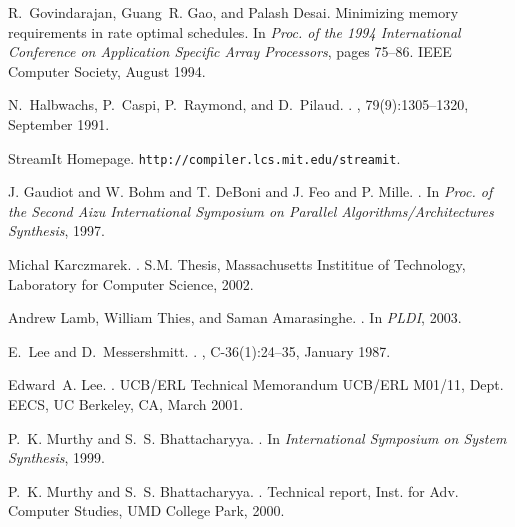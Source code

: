 \documentclass{sig-alt-full}
\begin{document}
{\begin{thebibliography}{10}
R.~Govindarajan, Guang~R. Gao, and Palash Desai.
\newblock Minimizing memory requirements in rate optimal schedules.
\newblock In {\em Proc. of the 1994 International Conference on Application
  Specific Array Processors}, pages 75--86. IEEE Computer Society, August 1994.

N.~Halbwachs, P.~Caspi, P.~Raymond, and D.~Pilaud.
.
, 79(9):1305--1320, September 1991.

StreamIt Homepage.
\newblock \texttt{http://compiler.lcs.mit.edu/streamit}.

{J. Gaudiot and W. Bohm and T. DeBoni and J. Feo and P. Mille}.
.
\newblock In {\em Proc. of the Second Aizu International Symposium on Parallel
  Algorithms/Architectures Synthesis}, 1997.

Michal Karczmarek.
.
\newblock S.M. Thesis, Massachusetts Instititue of Technology, Laboratory for
  Computer Science, 2002.

Andrew Lamb, William Thies, and Saman Amarasinghe.
.
\newblock In {\em {PLDI}}, 2003.

E.~Lee and D.~Messershmitt.
.
, C-36(1):24--35, January 1987.

Edward~A. Lee.
.
\newblock UCB/ERL Technical Memorandum UCB/ERL M01/11, Dept. EECS, UC Berkeley,
  CA, March 2001.

P.~K. Murthy and S.~S. Bhattacharyya.
.
\newblock In {\em International Symposium on System Synthesis}, 1999.

P.~K. Murthy and S.~S. Bhattacharyya.
.
\newblock Technical report, Inst. for Adv. Computer Studies, UMD College Park,
  2000.


\end{thebibliography}}
\end{document}
